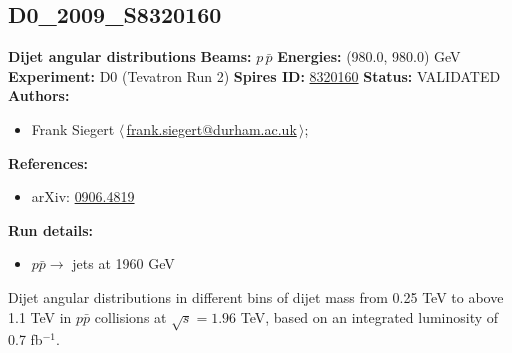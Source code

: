 \subsection[D0\_2009\_S8320160]{D0\_2009\_S8320160\,\cite{:2009mh}}
\textbf{Dijet angular distributions}\newline
\textbf{Beams:} $p$\,$\bar{p}$ \newline
\textbf{Energies:} (980.0, 980.0) GeV \newline
\textbf{Experiment:} D0 (Tevatron Run 2) \newline
\textbf{Spires ID:} \href{http://www.slac.stanford.edu/spires/find/hep/www?rawcmd=key+8320160}{8320160}\newline
\textbf{Status:} VALIDATED\newline
\textbf{Authors:}
\begin{itemize}
  \item Frank Siegert $\langle\,$\href{mailto:frank.siegert@durham.ac.uk}{frank.siegert@durham.ac.uk}$\,\rangle$;
\end{itemize}
\textbf{References:}
\begin{itemize}
  \item arXiv: \href{http://arxiv.org/abs/0906.4819}{0906.4819}
\end{itemize}
\textbf{Run details:}
\begin{itemize}

  \item $p \bar{p} \to$ jets at 1960 GeV\end{itemize}

\noindent Dijet angular distributions in different bins of dijet mass from 0.25 TeV to above 1.1 TeV in $p \bar{p}$ collisions at $\sqrt{s} = 1.96$ TeV, based on an integrated luminosity of 0.7 fb$^{-1}$.

\clearpage


\clearpage

